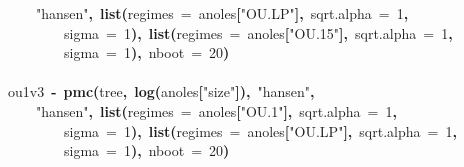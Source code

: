 \documentclass{elsarticle}
\makeatletter
\newcommand{\hlnumber}[1]{\textcolor[rgb]{0,0,0}{#1}}%
\newcommand{\hlfunctioncall}[1]{\textcolor[rgb]{.5,0,.33}{\textbf{#1}}}%
\newcommand{\hlstring}[1]{\textcolor[rgb]{.6,.6,1}{#1}}%
\newcommand{\hlkeyword}[1]{\textbf{#1}}%
\newcommand{\hlargument}[1]{\textcolor[rgb]{.69,.25,.02}{#1}}%
\newcommand{\hlassignement}[1]{\textbf{#1}}%
\newcommand{\hlsymbol}[1]{#1}%
\newcommand{\hlstd}[1]{\textcolor[rgb]{0,0,0}{#1}}%
\newenvironment{kframe}{%
 \def\FrameCommand##1{\hskip\@totalleftmargin \hskip-\fboxsep
 \colorbox{shadecolor}{##1}\hskip-\fboxsep
     \hskip-\linewidth \hskip-\@totalleftmargin \hskip\columnwidth}%
 \MakeFramed {\advance\hsize-\width
   \@totalleftmargin\z@ \linewidth\hsize
   \@setminipage}}%
 {\par\unskip\endMakeFramed}
\newenvironment{knitrout}{}{} %
\makeatother
\begin{document}
\begin{knitrout}
{\begin{kframe}
\begin{flushleft}
\hlstd{}{\ }{\ }{\ }{\ }\hlstring{"{}hansen"{}}\hlkeyword{,}{\ }\hlfunctioncall{list}\hlkeyword{(}\hlargument{regimes}{\ }\hlargument{=}{\ }\hlsymbol{anoles}\hlkeyword{[}\hlstring{"{}OU.LP"{}}\hlkeyword{]}\hlkeyword{,}{\ }\hlargument{sqrt.alpha}{\ }\hlargument{=}{\ }\hlnumber{1}\hlkeyword{,}\hspace*{\fill}\\
\hlstd{}{\ }{\ }{\ }{\ }{\ }{\ }{\ }{\ }\hlargument{sigma}{\ }\hlargument{=}{\ }\hlnumber{1}\hlkeyword{)}\hlkeyword{,}{\ }\hlfunctioncall{list}\hlkeyword{(}\hlargument{regimes}{\ }\hlargument{=}{\ }\hlsymbol{anoles}\hlkeyword{[}\hlstring{"{}OU.15"{}}\hlkeyword{]}\hlkeyword{,}{\ }\hlargument{sqrt.alpha}{\ }\hlargument{=}{\ }\hlnumber{1}\hlkeyword{,}\hspace*{\fill}\\
\hlstd{}{\ }{\ }{\ }{\ }{\ }{\ }{\ }{\ }\hlargument{sigma}{\ }\hlargument{=}{\ }\hlnumber{1}\hlkeyword{)}\hlkeyword{,}{\ }\hlargument{nboot}{\ }\hlargument{=}{\ }\hlnumber{20}\hlkeyword{)}\hspace*{\fill}\\
\hlstd{}\hspace*{\fill}\\
\hlstd{}\hlsymbol{ou1v3}{\ }\hlassignement{\usebox{\hlnormalsizeboxlessthan}-}{\ }\hlfunctioncall{pmc}\hlkeyword{(}\hlsymbol{tree}\hlkeyword{,}{\ }\hlfunctioncall{log}\hlkeyword{(}\hlsymbol{anoles}\hlkeyword{[}\hlstring{"{}size"{}}\hlkeyword{]}\hlkeyword{)}\hlkeyword{,}{\ }\hlstring{"{}hansen"{}}\hlkeyword{,}\hspace*{\fill}\\
\hlstd{}{\ }{\ }{\ }{\ }\hlstring{"{}hansen"{}}\hlkeyword{,}{\ }\hlfunctioncall{list}\hlkeyword{(}\hlargument{regimes}{\ }\hlargument{=}{\ }\hlsymbol{anoles}\hlkeyword{[}\hlstring{"{}OU.1"{}}\hlkeyword{]}\hlkeyword{,}{\ }\hlargument{sqrt.alpha}{\ }\hlargument{=}{\ }\hlnumber{1}\hlkeyword{,}\hspace*{\fill}\\
\hlstd{}{\ }{\ }{\ }{\ }{\ }{\ }{\ }{\ }\hlargument{sigma}{\ }\hlargument{=}{\ }\hlnumber{1}\hlkeyword{)}\hlkeyword{,}{\ }\hlfunctioncall{list}\hlkeyword{(}\hlargument{regimes}{\ }\hlargument{=}{\ }\hlsymbol{anoles}\hlkeyword{[}\hlstring{"{}OU.LP"{}}\hlkeyword{]}\hlkeyword{,}{\ }\hlargument{sqrt.alpha}{\ }\hlargument{=}{\ }\hlnumber{1}\hlkeyword{,}\hspace*{\fill}\\
\hlstd{}{\ }{\ }{\ }{\ }{\ }{\ }{\ }{\ }\hlargument{sigma}{\ }\hlargument{=}{\ }\hlnumber{1}\hlkeyword{)}\hlkeyword{,}{\ }\hlargument{nboot}{\ }\hlargument{=}{\ }\hlnumber{20}\hlkeyword{)}\hspace*{\fill}\\

\end{flushleft}
\end{kframe}}
\end{knitrout}
\end{document}
